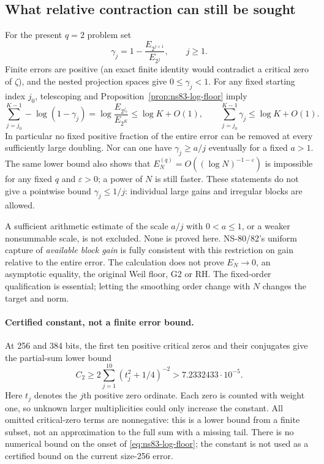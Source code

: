 \subsection{What relative contraction can still be sought}
For the present $q=2$ problem set
\[
 \gamma_j=1-\frac{E_{2^{j+1}}}{E_{2^j}},\qquad j\geq1.
\]
Finite errors are positive (an exact finite identity would contradict a
critical zero of $\zeta$), and the nested projection spaces give
$0\leq\gamma_j<1$. For any fixed starting index $j_0$, telescoping and
Proposition~\ref{prop:ns83-log-floor} imply
\begin{equation}
 \sum_{j=j_0}^{K-1}-\log(1-\gamma_j)
 =\log\frac{E_{2^{j_0}}}{E_{2^K}}
 \leq\log K+O(1),\qquad
 \sum_{j=j_0}^{K-1}\gamma_j\leq\log K+O(1).
 \label{eq:ns83-gain-budget}
\end{equation}
In particular no fixed positive fraction of the entire error can be
removed at every sufficiently large doubling. Nor can one have
$\gamma_j\geq a/j$ eventually for a fixed $a>1$.
The same lower bound also shows that $E_N^{(q)}=O((\log N)^{-1-\varepsilon})$ is impossible
for any fixed $q$ and $\varepsilon>0$; a power of $N$ is still faster.
These statements do not give a pointwise bound $\gamma_j\leq1/j$:
individual large gains and irregular blocks are allowed.

A sufficient arithmetic estimate of the scale $a/j$ with $0<a\leq1$,
or a weaker nonsummable scale, is not excluded. None is proved here.
NS-80/82's uniform capture of \emph{available block gain} is fully
consistent with this restriction on gain relative to the entire error.
The calculation does not prove $E_N\to0$, an asymptotic equality, the
original Weil floor, G2 or RH. The fixed-order qualification is essential;
letting the smoothing order change with $N$ changes the target and norm.

\paragraph{Certified constant, not a finite error bound.}
At 256 and 384 bits, the first ten positive critical zeros and their
conjugates give the partial-sum lower bound
\[
 C_2\geq2\sum_{j=1}^{10}(t_j^2+1/4)^{-2}
 >7.2332433\cdot10^{-5}.
\]
Here $t_j$ denotes the $j$th positive zero ordinate. Each zero is
counted with weight one, so unknown
larger multiplicities could only increase the constant. All omitted
critical-zero terms are nonnegative: this is a lower bound from a finite
subset, not an approximation to the full sum with a missing tail.
There is no numerical bound on the onset of
\eqref{eq:ns83-log-floor}; the constant is not used as a certified bound
on the current size-256 error.

